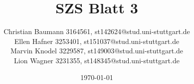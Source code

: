 \documentclass[a4paper, 15pt]{scrartcl}
\title{SZS Blatt 3}
\author{
	Christian Baumann 3164561, st142624@stud.uni-stuttgart.de \\ 
	Ellen Hafner 3253401, st151037@stud.uni-stuttgart.de \\ 
	Marvin Knodel 3229587, st149003@stud.uni-stuttgart.de\\ 
	Lion Wagner 3231355, st148345@stud.uni-stuttgart.de}
\date{\today}
\begin{document}
	\maketitle
	\newpage
		\mbox{}
		
	\newpage
		
	\newpage
		
\end{document}
